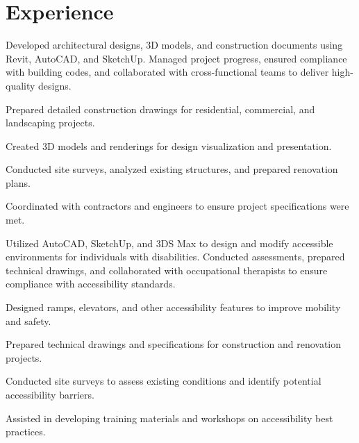 \section{Experience}
\betweenProjectsVSpace
{}
\betweenSummaryPointsVSpace
Developed architectural designs, 3D models, and construction documents using Revit, AutoCAD, and SketchUp. Managed project progress, ensured compliance with building codes, and collaborated with cross-functional teams to deliver high-quality designs.
\begin{tightemize}
\item Prepared detailed construction drawings for residential, commercial, and landscaping projects.
\item Created 3D models and renderings for design visualization and presentation.
\item Conducted site surveys, analyzed existing structures, and prepared renovation plans.
\item Coordinated with contractors and engineers to ensure project specifications were met.
\end{tightemize}
\betweenProjectsVSpace
{}
\betweenSummaryPointsVSpace
Utilized AutoCAD, SketchUp, and 3DS Max to design and modify accessible environments for individuals with disabilities. Conducted assessments, prepared technical drawings, and collaborated with occupational therapists to ensure compliance with accessibility standards.
\begin{tightemize}
\item Designed ramps, elevators, and other accessibility features to improve mobility and safety.
\item Prepared technical drawings and specifications for construction and renovation projects.
\item Conducted site surveys to assess existing conditions and identify potential accessibility barriers.
\item Assisted in developing training materials and workshops on accessibility best practices.
\end{tightemize}
\betweenProjectsVSpace
{}
